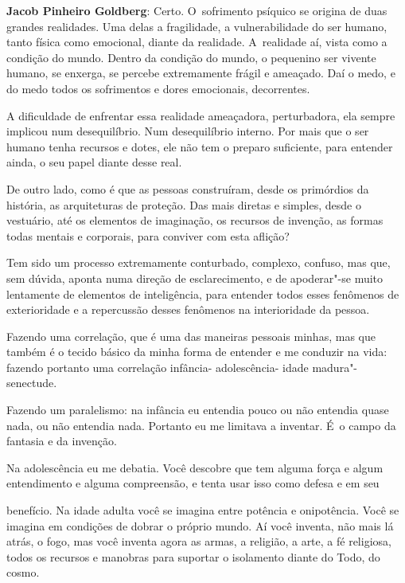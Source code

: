  

\textbf{Jacob Pinheiro Goldberg}: Certo. O~sofrimento psíquico se
origina de duas grandes realidades. Uma delas a fragilidade, a
vulnerabilidade do ser humano, tanto física como emocional, diante da
realidade. A~realidade aí, vista como a condição do mundo. Dentro da
condição do mundo, o pequenino ser vivente humano, se enxerga, se
percebe extremamente frágil e ameaçado. Daí o medo, e do medo todos os
sofrimentos e dores emocionais, decorrentes.

 

A dificuldade de enfrentar essa realidade ameaçadora, perturbadora, ela
sempre implicou num desequilíbrio. Num desequilíbrio interno. Por mais
que o ser humano tenha recursos e dotes, ele não tem o preparo
suficiente, para entender ainda, o seu papel diante desse real.

 

De outro lado, como é que as pessoas construíram, desde os primórdios da
história, as arquiteturas de proteção. Das mais diretas e simples, desde
o vestuário, até os elementos de imaginação, os recursos de invenção, as
formas todas mentais e corporais, para conviver com esta aflição?

 

Tem sido um processo extremamente conturbado, complexo, confuso, mas que,
sem dúvida, aponta numa direção de esclarecimento, e de apoderar"-se muito
lentamente de elementos de inteligência, para entender todos esses
fenômenos de exterioridade e a repercussão desses fenômenos na
interioridade da pessoa.

 

Fazendo uma correlação, que é uma das maneiras pessoais minhas, mas que
também é o tecido básico da minha forma de entender e me conduzir na
vida: fazendo portanto uma correlação infância- adolescência- idade
madura"-senectude.

 

Fazendo um paralelismo: na infância eu entendia pouco ou não entendia
quase nada, ou não entendia nada. Portanto eu me limitava a inventar. É~o campo da fantasia e da invenção.

 

Na adolescência eu me debatia. Você descobre que tem alguma força e
algum entendimento e alguma compreensão, e tenta usar isso como defesa e
em seu

benefício. Na idade adulta você se imagina entre potência e onipotência.
Você se imagina em condições de dobrar o próprio mundo. Aí você inventa,
não mais lá atrás, o fogo, mas você inventa agora as armas, a religião,
a arte, a fé religiosa, todos os recursos e manobras para suportar o
isolamento diante do Todo, do cosmo.

